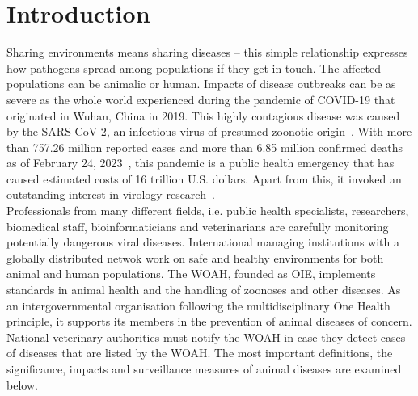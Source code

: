 \chapter{Introduction}\label{chap:introduction}

Sharing environments means sharing diseases -- this simple relationship expresses how pathogens spread among populations if they get in touch. The affected populations can be animalic or human. Impacts of disease outbreaks can be as severe as the whole world experienced during the pandemic of \ac{COVID-19} that originated in Wuhan, China in 2019. This highly contagious disease was caused by the \ac{SARS-CoV-2}, an infectious virus of presumed zoonotic origin~\cite{wu2020new}. With more than 757.26 million reported cases and more than 6.85 million confirmed deaths as of February 24, 2023~, this pandemic is a public health emergency that has caused estimated costs of 16 trillion U.S. dollars. Apart from this, it invoked an outstanding interest in virology research~\cite{covid}. \\
Professionals from many different fields, i.e. public health specialists, researchers, biomedical staff, bioinformaticians and veterinarians are carefully monitoring potentially dangerous viral diseases. International managing institutions with a globally distributed netwok work on safe and healthy environments for both animal and human populations. The \ac{WOAH}, founded as \ac{OIE}, implements standards in animal health and the handling of zoonoses and other diseases. As an intergovernmental organisation following the multidisciplinary One Health principle, it supports its members in the prevention of animal diseases of concern. National veterinary authorities must notify the \ac{WOAH} in case they detect cases of diseases that are listed by the \ac{WOAH}. The most important definitions, the significance, impacts and surveillance measures of animal diseases are examined below.

